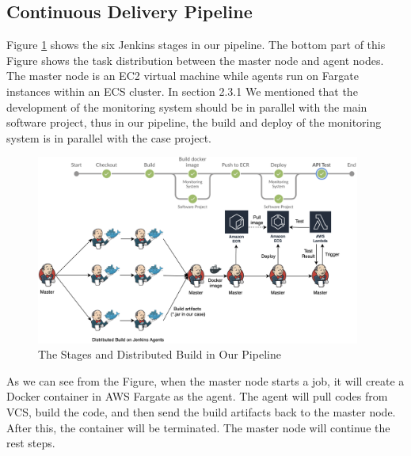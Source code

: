 \subsection{Continuous Delivery Pipeline}
\label{our-ci}
Figure \ref{fig:overview} shows the six Jenkins stages in our pipeline. The bottom part of this Figure shows the task distribution between the master node and agent nodes. The master node is an EC2 virtual machine while agents run on Fargate instances within an ECS cluster. In section 2.3.1 We mentioned that the development of the monitoring system should be in parallel with the main software project, thus in our pipeline, the build and deploy of the monitoring system is in parallel with the case project.
\begin{figure}[!h]
     \centering
     \includegraphics[width=0.95\textwidth]{pics/overview.png}
     \caption{The Stages and Distributed Build in Our Pipeline}
     \label{fig:overview}
    \end{figure}
\par
As we can see from the Figure, when the master node starts a job, it will create a Docker container in AWS Fargate as the agent. The agent will pull codes from VCS, build the code, and then send the build artifacts back to the master node. After this, the container will be terminated. The master node will continue the rest steps.
